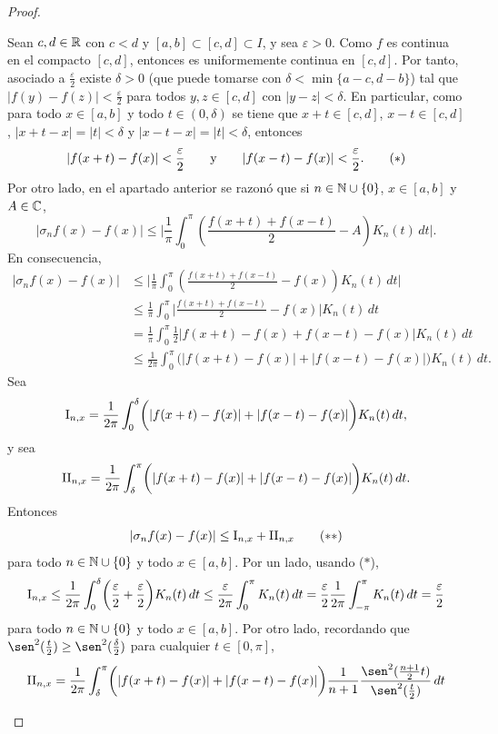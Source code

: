 \documentclass[a4paper, 11pt, oneside]{report}
\begin{document}
\begin{proof}
\begin{enumerate}
    Sean $c,d \in \mathbb R$ con $c < d$ y $[a,b] \subset [c,d] \subset I$, y sea $\varepsilon > 0$. Como $f$ es continua en el compacto $[c,d]$, entonces es uniformemente continua en $[c,d]$. Por tanto, asociado a $\frac{\varepsilon}{2}$ existe $\delta > 0$ (que puede tomarse con $\delta < \min\{a-c,d-b\}$) tal que $|f(y)-f(z)| < \frac{\varepsilon}{2}$ para todos $y,z \in [c,d]$ con $|y-z|<\delta$. En particular, como para todo $x \in [a,b]$ y todo $t \in (0,\delta)$ se tiene que $x+t\in [c,d]$, $x-t \in [c,d]$, $|x+t-x|=|t|<\delta$ y $|x-t-x| = |t|<\delta$, entonces
    \[|f(x+t)-f(x)| < \frac{\varepsilon}{2} \qquad \textup{y} \qquad |f(x-t)-f(x)| < \frac{\varepsilon}{2}. \tag{$\ast$}\]
    Por otro lado, en el apartado anterior se razonó que si $n \in \mathbb N \cup \{0\}$, $x \in [a,b]$ y $A \in \mathbb C$,
    \[|\sigma_nf(x)-f(x)| \leq \biggl|\frac{1}{\pi}\int_0^\pi\left(\frac{f(x+t)+f(x-t)}{2}-A\right) K_n(t) \, dt\biggr|.\]
    En consecuencia,
    \begin{align*}
      |\sigma_nf(x)-f(x)| &\leq \biggl|\frac{1}{\pi}\int_0^\pi\left(\frac{f(x+t)+f(x-t)}{2}-f(x)\right) K_n(t) \, dt\biggr| \\
      &\leq \frac{1}{\pi}\int_0^\pi \biggl|\frac{f(x+t)+f(x-t)}{2}-f(x)\biggr| K_n(t) \, dt \\
      &= \frac{1}{\pi}\int_0^\pi \frac{1}{2}\biggl|f(x+t)-f(x)+f(x-t)-f(x)\biggr| K_n(t) \, dt \\
      &\leq \frac{1}{2\pi}\int_0^\pi \biggl(|f(x+t)-f(x)|+|f(x-t)-f(x)|\biggr) K_n(t) \, dt.
    \end{align*}
    Sea
    \[\textup{I}_{n,x} = \frac{1}{2\pi}\int_0^\delta \biggl(|f(x+t)-f(x)|+|f(x-t)-f(x)|\biggr) K_n(t) \, dt,\] y sea \[\textup{II}_{n,x} = \frac{1}{2\pi}\int_\delta^\pi\biggl(|f(x+t)-f(x)|+|f(x-t)-f(x)|\biggr) K_n(t) \, dt.\]
    Entonces
    \[|\sigma_nf(x)-f(x)| \leq \textup{I}_{n,x} + \textup{II}_{n,x} \tag{$\ast\ast$}\]
    para todo $n \in \mathbb N \cup \{0\}$ y todo $x \in [a,b]$. Por un lado, usando ($\ast$),
    \[\textup{I}_{n,x} \leq \frac{1}{2\pi}\int_0^\delta \biggl(\frac{\varepsilon}{2}+\frac{\varepsilon}{2}\biggr)K_n(t) \, dt \leq \frac{\varepsilon}{2\pi}\int_0^\pi K_n(t) \, dt =\frac{\varepsilon}{2} \frac{1}{2\pi}\int_{-\pi}^\pi K_n(t) \, dt= \frac{\varepsilon}{2}\]
    para todo $n \in \mathbb N \cup \{0\}$ y todo $x \in [a,b]$. Por otro lado, recordando que $\sen^2(\frac{t}{2}) \geq \sen^2(\frac{\delta}{2}) $ para cualquier $t \in [0,\pi]$,
    \begin{align*}
      \textup{II}_{n,x} &=  \frac{1}{2\pi}\int_\delta^\pi\biggl(|f(x+t)-f(x)|+|f(x-t)-f(x)|\biggr)\frac{1}{n+1}\frac{\sen^2(\frac{n+1}{2}t)}{\sen^2(\frac{t}{2})} \, dt \\

\end{align*}
\end{enumerate}
\end{proof}
\end{document}
